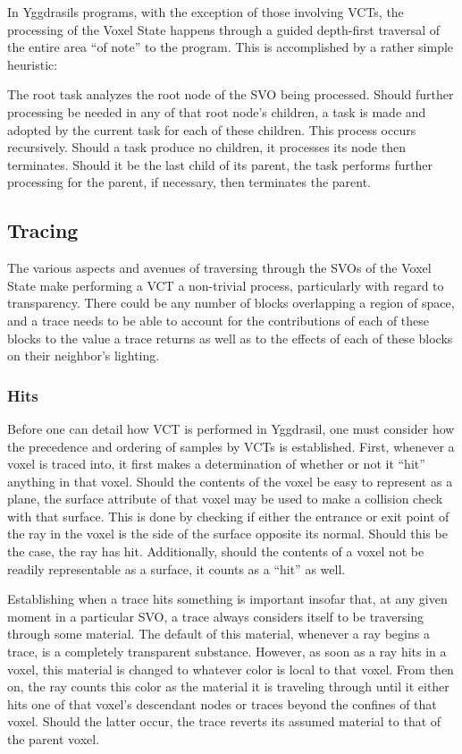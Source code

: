 \documentclass[onecolumn, draftclsnofoot,10pt, compsoc]{IEEEtran}
\begin{document}
In Yggdrasils programs, with the exception of those involving VCTs, the processing of the Voxel State happens through a guided depth-first traversal of the entire area “of note” to the program. This is accomplished by a rather simple heuristic:

The root task analyzes the root node of the SVO being processed. Should further processing be needed in any of that root node’s children, a task is made and adopted by the current task for each of these children. This process occurs recursively. Should a task produce no children, it processes its node then terminates. Should it be the last child of its parent, the task performs further processing for the parent, if necessary, then terminates the parent.


\subsection{Tracing}

The various aspects and avenues of traversing through the SVOs of the Voxel State make performing a VCT a non-trivial process, particularly with regard to transparency. There could be any number of blocks overlapping a region of space, and a trace needs to be able to account for the contributions of each of these blocks to the value a trace returns as well as to the effects of each of these blocks on their neighbor’s lighting.

\subsubsection{Hits}

Before one can detail how VCT is performed in Yggdrasil, one must consider how the precedence and ordering of samples by VCTs is established. First, whenever a voxel is traced into, it first makes a determination of whether or not it “hit” anything in that voxel. Should the contents of the voxel be easy to represent as a plane, the surface attribute of that voxel may be used to make a collision check with that surface. This is done by checking if either the entrance or exit point of the ray in the voxel is the side of the surface opposite its normal. Should this be the case, the ray has hit. Additionally, should the contents of a voxel not be readily representable as a surface, it counts as a “hit” as well.

Establishing when a trace hits something is important insofar that, at any given moment in a particular SVO, a trace always considers itself to be traversing through some material. The default of this material, whenever a ray begins a trace, is a completely transparent substance. However, as soon as a ray hits in a voxel, this material is changed to whatever color is local to that voxel. From then on, the ray counts this color as the material it is traveling through until it either hits one of that voxel’s descendant nodes or traces beyond the confines of that voxel. Should the latter occur, the trace reverts its assumed material to that of the parent voxel. 
\end{document}
